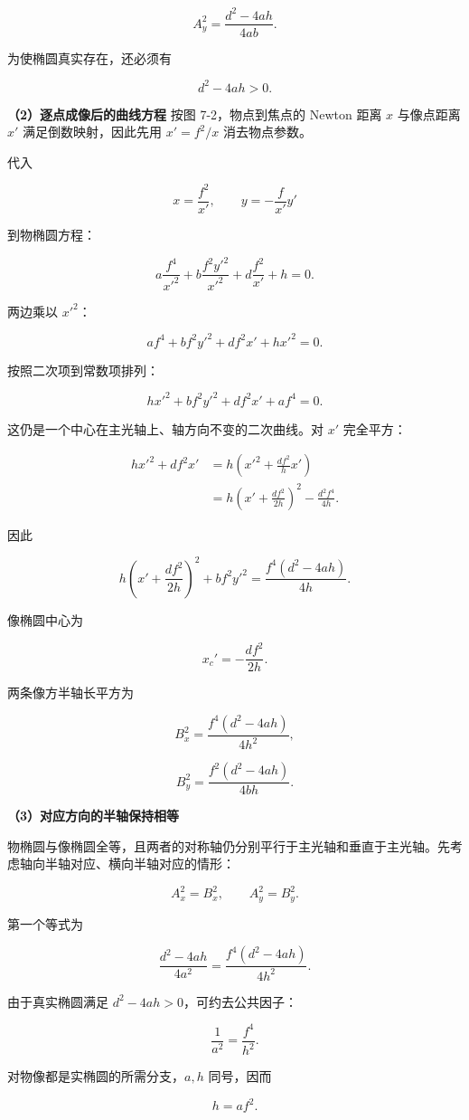 \documentclass[12pt,a4paper,UTF8]{ctexart}
\begin{document}
\[A_y^2=\frac{d^2-4ah}{4ab}.\]

为使椭圆真实存在，还必须有

\[d^2-4ah>0.\]

\textbf{（2）逐点成像后的曲线方程} 按图 7-2，物点到焦点的 Newton 距离
\(x\) 与像点距离 \(x'\) 满足倒数映射，因此先用 \(x'=f^2/x\)
消去物点参数。

代入

\[x=\frac{f^2}{x'},\qquad y=-\frac f{x'}y'\]

到物椭圆方程：

\[a\frac{f^4}{x'^2}
+b\frac{f^2y'^2}{x'^2}
+d\frac{f^2}{x'}+h=0.\]

两边乘以 \(x'^2\)：

\[af^4+bf^2y'^2+df^2x'+hx'^2=0.\]

按照二次项到常数项排列：

\[hx'^2+bf^2y'^2+df^2x'+af^4=0.\]

这仍是一个中心在主光轴上、轴方向不变的二次曲线。对 \(x'\) 完全平方：

\[\begin{aligned}
hx'^2+df^2x'
&=h\left(x'^2+\frac{df^2}{h}x'\right)\\
&=h\left(x'+\frac{df^2}{2h}\right)^2
-\frac{d^2f^4}{4h}.
\end{aligned}\]

因此

\[h\left(x'+\frac{df^2}{2h}\right)^2+bf^2y'^2
=\frac{f^4(d^2-4ah)}{4h}.\]

像椭圆中心为

\[x_c'=-\frac{df^2}{2h}.\]

两条像方半轴长平方为

\[B_x^2=\frac{f^4(d^2-4ah)}{4h^2},\]

\[B_y^2=\frac{f^2(d^2-4ah)}{4bh}.\]

\textbf{（3）对应方向的半轴保持相等}

物椭圆与像椭圆全等，且两者的对称轴仍分别平行于主光轴和垂直于主光轴。先考虑轴向半轴对应、横向半轴对应的情形：

\[A_x^2=B_x^2,\qquad A_y^2=B_y^2.\]

第一个等式为

\[\frac{d^2-4ah}{4a^2}
=\frac{f^4(d^2-4ah)}{4h^2}.\]

由于真实椭圆满足 \(d^2-4ah>0\)，可约去公共因子：

\[\frac1{a^2}=\frac{f^4}{h^2}.\]

对物像都是实椭圆的所需分支，\(a,h\) 同号，因而

\[h=af^2.\]
\end{document}
